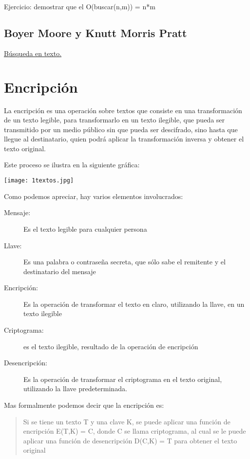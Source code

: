 Ejercicio: demostrar que el O(buscar(n,m)) = n*m

\subsection{Boyer Moore y Knutt Morris Pratt}
\label{sec:boyer-moore-y}
\href{http://users.dcc.uchile.cl/~bebustos/apuntes/cc30a/BusqTexto/}{Búsqueda
  en texto.}

\section{Encripción}
\label{sec:encripcion}

La encripción es una operación sobre textos que consiste en una
transformación de un texto legible, para transformarlo en un texto
ilegible, que pueda ser transmitido por un medio público sin que pueda
ser descifrado, sino hasta que llegue al destinatario, quien podrá
aplicar la transformación inversa y obtener el texto original.

Este proceso se ilustra en la siguiente gráfica:

\begin{center}
  \texttt{[image: 1textos.jpg]}
\end{center}

Como podemos apreciar, hay varios elementos involucrados:
\begin{description}
\item[Mensaje: ] Es el texto legible para cualquier persona
\item[Llave: ] Es una palabra o contraseña secreta, que sólo sabe el
  remitente y el destinatario del mensaje
\item[Encripción: ] Es la operación de transformar el texto en claro,
  utilizando la llave, en un texto ilegible
\item[Criptograma: ] es el texto ilegible, resultado de la operación
  de encripción
\item[Desencripción: ] Es la operación de transformar el criptograma
  en el texto original, utilizando la llave predeterminada.
\end{description}

Mas formalmente podemos decir que la encripción es:

\begin{quote}
  Si se tiene un texto T y una clave K, se puede aplicar una función
  de encripción E(T,K) = C, donde C se llama criptograma, al cual se
  le puede aplicar una función de desencripción D(C,K) = T para
  obtener el texto original
\end{quote}

